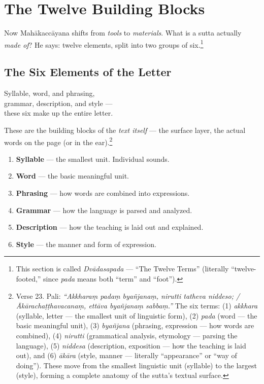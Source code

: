 \ornament

\section*{The Twelve Building Blocks}

Now Mahākaccāyana shifts from \textit{tools} to \textit{materials}. What is a sutta actually \textit{made of}? He says: twelve elements, split into two groups of six.\footnote{This section is called \textit{Dvādasapada} --- ``The Twelve Terms'' (literally ``twelve-footed,'' since \textit{pada} means both ``term'' and ``foot'').}

\subsection*{The Six Elements of the Letter}

\begin{versebox}
Syllable, word, and phrasing,\\
grammar, description, and style ---\\
these six make up the entire letter.
\end{versebox}

These are the building blocks of the \textit{text itself} --- the surface layer, the actual words on the page (or in the ear).\footnote{Verse 23. Pali: \textit{``Akkharaṃ padaṃ byañjanaṃ, nirutti tatheva niddeso; / Ākārachaṭṭhavacanaṃ, ettāva byañjanaṃ sabbaṃ.''} The six terms: (1) \textit{akkhara} (syllable, letter --- the smallest unit of linguistic form), (2) \textit{pada} (word --- the basic meaningful unit), (3) \textit{byañjana} (phrasing, expression --- how words are combined), (4) \textit{nirutti} (grammatical analysis, etymology --- parsing the language), (5) \textit{niddesa} (description, exposition --- how the teaching is laid out), and (6) \textit{ākāra} (style, manner --- literally ``appearance'' or ``way of doing''). These move from the smallest linguistic unit (syllable) to the largest (style), forming a complete anatomy of the sutta's textual surface.}

\begin{enumerate}[itemsep=2pt]
\item \textbf{Syllable} --- the smallest unit. Individual sounds.
\item \textbf{Word} --- the basic meaningful unit.
\item \textbf{Phrasing} --- how words are combined into expressions.
\item \textbf{Grammar} --- how the language is parsed and analyzed.
\item \textbf{Description} --- how the teaching is laid out and explained.
\item \textbf{Style} --- the manner and form of expression.
\end{enumerate}


